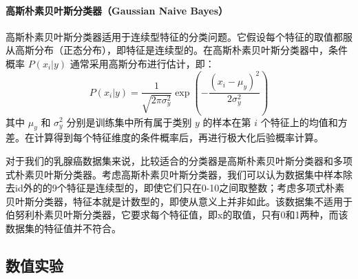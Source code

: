 \documentclass[a4paper,12pt,onecolumn,oneside]{article}
\begin{document}
	\paragraph{高斯朴素贝叶斯分类器（Gaussian Naive Bayes）}
	高斯朴素贝叶斯分类器适用于连续型特征的分类问题。它假设每个特征的取值都服从高斯分布（正态分布），即特征是连续型的。在高斯朴素贝叶斯分类器中，条件概率 $P(x_i | y)$ 通常采用高斯分布进行估计，即：
	$$ P(x_i|y) = \frac{1}{\sqrt{2\pi\sigma_y^2}}\exp\left(-\frac{(x_i-\mu_y)^2}{2\sigma_y^2}\right) $$
	其中 $\mu_y$ 和 $\sigma_y^2$ 分别是训练集中所有属于类别 $y$ 的样本在第 $i$ 个特征上的均值和方差。在计算得到每个特征维度的条件概率后，再进行极大化后验概率计算。\par 
	对于我们的乳腺癌数据集来说，比较适合的分类器是高斯朴素贝叶斯分类器和多项式朴素贝叶斯分类器。考虑高斯朴素贝叶斯分类器，我们可以认为数据集中样本除去id外的的9个特征是连续型的，即使它们只在0-10之间取整数；考虑多项式朴素贝叶斯分类器，特征本就是计数型的，即使从意义上并非如此。该数据集不适用于伯努利朴素贝叶斯分类器，它要求每个特征值，即x的取值，只有0和1两种，而该数据集的特征值并不符合。
\subsection{数值实验}
\end{document}
